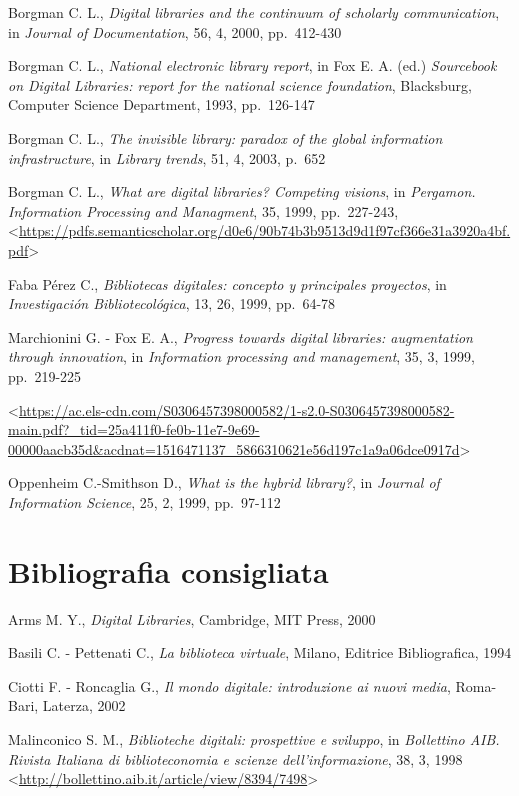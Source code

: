 \documentclass[
  b5paper,
  twoside,
  11pt,
  chapterprefix=false,
  bibliography=totocnumbered,
  listof=flat]{scrbook}
\begin{document}
Borgman C. L., \emph{Digital libraries and the continuum of scholarly
communication}, in \emph{Journal of Documentation}, 56, 4, 2000, pp.~412-430

Borgman C. L., \emph{National electronic library report}, in Fox E. A. (ed.)
\emph{Sourcebook on Digital Libraries: report for the national science
foundation}, Blacksburg, Computer Science Department, 1993, pp.~126-147

Borgman C. L., \emph{The invisible library: paradox of the global information
infrastructure}, in \emph{Library trends}, 51, 4, 2003, p.~652

Borgman C. L., \emph{What are digital libraries? Competing visions}, in
\emph{Pergamon. Information Processing and Managment}, 35, 1999, pp.~227-243,
\textless{}{\url{https://pdfs.semanticscholar.org/d0e6/90b74b3b9513d9d1f97cf366e31a3920a4bf.pdf}\textgreater{}}

Faba Pérez C., \emph{Bibliotecas digitales: concepto y principales
proyectos}, in \emph{Investigación Bibliotecológica}, 13, 26, 1999, pp.~64-78

Marchionini G. - Fox E. A., \emph{Progress towards digital libraries:
augmentation through innovation}, in \emph{Information processing and
management}, 35, 3, 1999, pp.~219-225

\textless{}{\url{https://ac.els-cdn.com/S0306457398000582/1-s2.0-S0306457398000582-main.pdf?_tid=25a411f0-fe0b-11e7-9e69-00000aacb35d\&acdnat=1516471137_5866310621e56d197c1a9a06dce0917d}\textgreater{}}

Oppenheim C.-Smithson D., \emph{What is the hybrid library?}, in \emph{Journal of
Information Science}, 25, 2, 1999, pp.~97-112

\hypertarget{bibliografia-consigliata-1}{%
\section*{Bibliografia consigliata}\label{bibliografia-consigliata-1}}

Arms M. Y., \emph{Digital Libraries}, Cambridge, MIT Press, 2000

Basili C. - Pettenati C., \emph{La biblioteca virtuale}, Milano, Editrice
Bibliografica, 1994

Ciotti F. - Roncaglia G., \emph{Il mondo digitale: introduzione ai nuovi
media}, Roma-Bari, Laterza, 2002

Malinconico S. M., \emph{Biblioteche digitali: prospettive e sviluppo}, in
\emph{Bollettino AIB. Rivista Italiana di biblioteconomia e scienze
dell'informazione}, 38, 3, 1998
\textless{}{\url{http://bollettino.aib.it/article/view/8394/7498}\textgreater{}}
\end{document}
